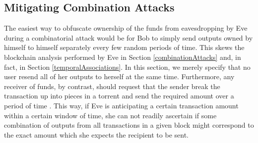 \documentclass[12pt,english]{mrl}
\theoremstyle{definition}
\numberwithin{equation}{section}
\numberwithin{figure}{section}
\numberwithin{equation}{section}
\numberwithin{equation}{section}
\numberwithin{figure}{section}
\begin{document}

\subsection{Mitigating Combination Attacks}\label{mitigCombo}

The easiest way to obfuscate ownership of the funds from eavesdropping by Eve during a combinatorial attack would be for Bob to simply send outputs owned by himself to himself separately every few random periods of time. This skews the blockchain analysis performed by Eve in Section \ref{combinationAttacks} and, in fact, in Section \ref{temporalAssociations}. In this section, we merely specify that no user resend all of her outputs to herself at the same time. Furthermore, any receiver of funds, by contrast, should request that the sender break the transaction up into pieces in a torrent and send the required amount over a period of time . This way, if Eve is anticipating a certain transaction amount within a certain window of time, she can not readily ascertain if some combination of outputs from all transactions in a given block might correspond to the exact amount which she expects the recipient to be sent.
\end{document}

